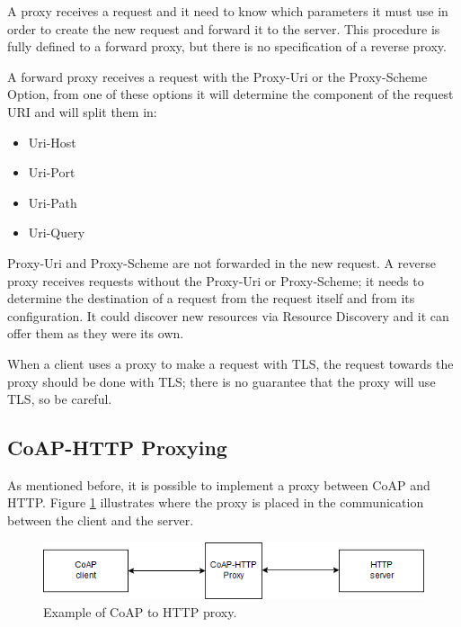 	A proxy receives a request and it need to know which parameters it must use in order to create the new request and forward it to the server.\newline
	This procedure is fully defined to a forward proxy, but there is no specification of a reverse proxy.\newline
	
	A forward proxy receives a request with the Proxy-Uri or the Proxy-Scheme Option, from one of these options it will determine the component of the request URI and will split them in:
	\begin{itemize}
		\item Uri-Host
		\item Uri-Port
		\item Uri-Path
		\item Uri-Query
	\end{itemize}

	Proxy-Uri and Proxy-Scheme are not forwarded in the new request.\newline
	A reverse proxy receives requests without the Proxy-Uri or Proxy-Scheme; it needs to determine the destination of a request from the request itself and from its configuration.\newline
	It could discover new resources via Resource Discovery and it can offer them as they were its own.\newline
	
	When a client uses a proxy to make a request with TLS, the request towards the proxy should be done with TLS; there is no guarantee that the proxy will use TLS, so be careful.\newline
	
	\subsection{CoAP-HTTP Proxying}
	As mentioned before, it is possible to implement a proxy between CoAP and HTTP.\newline
	Figure \ref{fig:coap2} illustrates where the proxy is placed in the communication between the client and the server.
	
	\begin{figure}
		\includegraphics[width=\linewidth]{coap-img1.png}
		\caption{Example of CoAP to HTTP proxy.}
		\label{fig:coap2}
	\end{figure}
	

